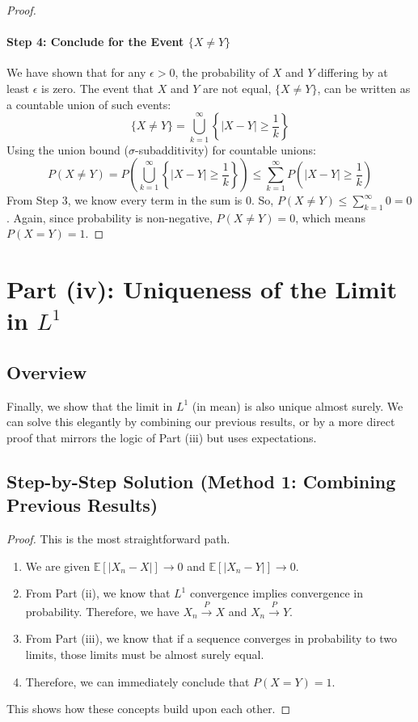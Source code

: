 \documentclass[11pt,a4paper]{article}
\theoremstyle{exercise}
\begin{document}
\begin{proof}
\paragraph{Step 4: Conclude for the Event $\{X \neq Y\}$}
We have shown that for any $\epsilon > 0$, the probability of $X$ and $Y$ differing by at least $\epsilon$ is zero. The event that $X$ and $Y$ are not equal, $\{X \neq Y\}$, can be written as a countable union of such events:
\[
\{X \neq Y\} = \bigcup_{k=1}^{\infty} \left\{|X - Y| \ge \frac{1}{k}\right\}
\]
Using the union bound ($\sigma$-subadditivity) for countable unions:
\[
P(X \neq Y) = P\left(\bigcup_{k=1}^{\infty} \left\{|X - Y| \ge \frac{1}{k}\right\}\right) \le \sum_{k=1}^{\infty} P\left(|X - Y| \ge \frac{1}{k}\right)
\]
From Step 3, we know every term in the sum is 0. So, $P(X \neq Y) \le \sum_{k=1}^{\infty} 0 = 0$.
Again, since probability is non-negative, $P(X \neq Y) = 0$, which means $P(X = Y) = 1$.
\end{proof}

\section*{Part (iv): Uniqueness of the Limit in $L^1$}

\subsection*{Overview}
Finally, we show that the limit in $L^1$ (in mean) is also unique almost surely. We can solve this elegantly by combining our previous results, or by a more direct proof that mirrors the logic of Part (iii) but uses expectations.

\subsection*{Step-by-Step Solution (Method 1: Combining Previous Results)}
\begin{proof}
This is the most straightforward path.
\begin{enumerate}
    \item We are given $\mathbb{E}[|X_n - X|] \to 0$ and $\mathbb{E}[|X_n - Y|] \to 0$.
    \item From Part (ii), we know that $L^1$ convergence implies convergence in probability.
    Therefore, we have $X_n \xrightarrow{P} X$ and $X_n \xrightarrow{P} Y$.
    \item From Part (iii), we know that if a sequence converges in probability to two limits, those limits must be almost surely equal.
    \item Therefore, we can immediately conclude that $P(X = Y) = 1$.
\end{enumerate}
This shows how these concepts build upon each other.
\end{proof}
\end{document}
